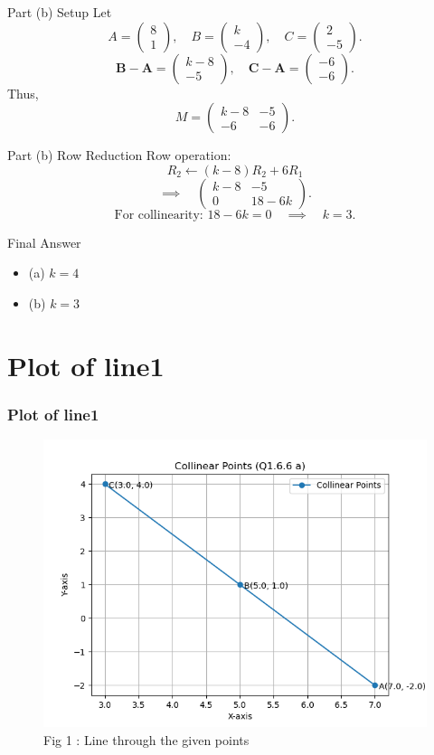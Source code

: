 \documentclass{beamer}
\theoremstyle{remark}
\newcommand{\myvec}[1]{\ensuremath{\begin{pmatrix}#1\end{pmatrix}}}
\let\vec\mathbf
\numberwithin{equation}{section}
\begin{document}
\begin{frame}{Part (b) Setup}
Let
\[
A=\myvec{8\\1}, \quad B=\myvec{k\\-4}, \quad C=\myvec{2\\-5}.
\]
\[
\vec{B}-\vec{A} = \myvec{k-8\\ -5}, \quad
\vec{C}-\vec{A} = \myvec{-6\\ -6}.
\]
Thus,
\[
M = \myvec{k-8 & -5\\ -6 & -6}.
\]
\end{frame}

\begin{frame}{Part (b) Row Reduction}
Row operation:
\[
R_2 \leftarrow (k-8)R_2 + 6R_1
\]
\[
\implies \quad \myvec{k-8 & -5\\ 0 & 18-6k}.
\]
\[
\text{For collinearity: } 18-6k=0 \quad \implies \quad k=\boxed{3}.
\]
\end{frame}

\begin{frame}{Final Answer}
\begin{itemize}
\item (a) $k=4$
\item (b) $k=3$
\end{itemize}
\end{frame}


\section{Plot of line1}

\begin{frame}
\frametitle{Plot of line1}

\begin{figure}[h!]
  \centering
  \includegraphics[width=0.5\columnwidth]{figs/fig_a.png} 
   \caption*{Fig 1 : Line through the given points}
  \label{Fig1}
\end{figure}

\end{frame}
\end{document}
